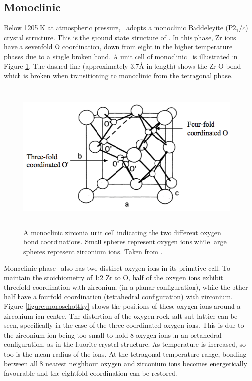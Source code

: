 \subsection{Monoclinic}

Below 1205 K at atmospheric pressure, \zirconia\ adopts a monoclinic Baddeleyite (P$2_{1}/c$) crystal structure. This is the ground state structure of \zirconia . In this phase, Zr ions have a sevenfold O coordination, down from eight in the higher temperature phases due to a single broken bond. A unit cell of monoclinic \zirconia\ is illustrated in Figure \ref{figure:coordination}. The dashed line (approximately 3.7\r{A} in length) shows the Zr-O bond which is broken when transitioning to monoclinic from the tetragonal phase.

\begin{figure}[htp] %
\centering
\includegraphics[height=7.5cm]{images/coordination.png}
\caption[A monoclinic zirconia unit cell indicating the two different oxygen bond coordinations. Small spheres represent oxygen ions while large spheres represent zirconium ions.]{A monoclinic zirconia unit cell indicating the two different oxygen bond coordinations. Small spheres represent oxygen ions while large spheres represent zirconium ions. Taken from \cite{Xia2010}.
\label{figure:coordination}}
\end{figure}

Monoclinic phase \zirconia\ also has two distinct oxygen ions in its primitive cell. To maintain the stoichiometry of 1:2 Zr to O, half of the oxygen ions exhibit threefold coordination with zirconium (in a planar configuration), while the other half have a fourfold coordination (tetrahedral configuration) with zirconium. Figure \ref{figure:monoschottky} shows the positions of these oxygen ions around a zirconium ion centre. The distortion of the oxygen rock salt sub-lattice can be seen, specifically in the case of the three coordinated oxygen ions. This is due to the zirconium ion being too small to hold 8 oxygen ions in an octahedral configuration, as in the fluorite crystal structure. As temperature is increased, so too is the mean radius of the ions. At the tetragonal temperature range, bonding between all 8 nearest neighbour oxygen and zirconium ions becomes energetically favourable and the eightfold coordination can be restored. 

